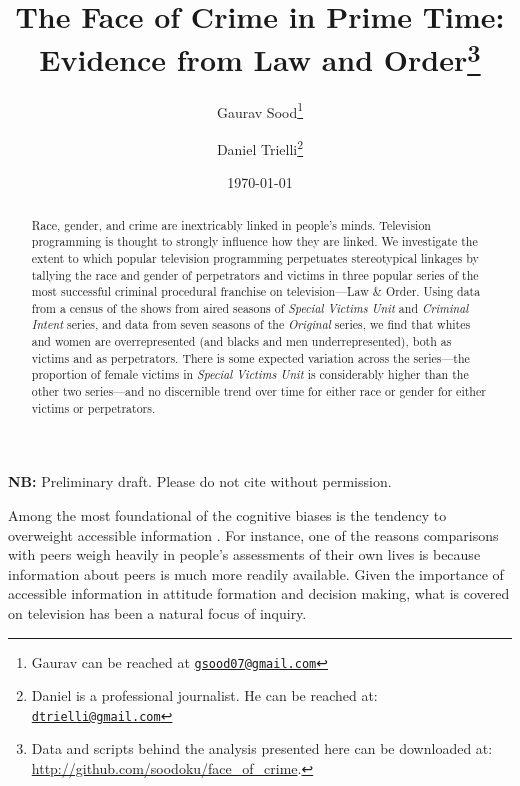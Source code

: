 \documentclass[12pt, letterpaper]{article}
\title{\Large{The Face of Crime in Prime Time:\\ Evidence from Law and Order}\footnote{Data and scripts behind the analysis presented here can be downloaded at: \url{http://github.com/soodoku/face_of_crime}.}}
\author{Gaurav Sood\thanks{Gaurav can be reached at \href{mailto:gsood07@gmail.com}{\footnotesize{\texttt{gsood07@gmail.com}}}} \and Daniel Trielli\thanks{Daniel is a professional journalist. He can be reached at: \href{mailto:dtrielli@gmail.com}{\footnotesize{\texttt{dtrielli@gmail.com}}}}\vspace{.5cm}}
\date{\vspace{.5cm}\normalsize{\today}}
\begin{document}
\maketitle

\begin{center}
\vspace{.5cm}\textbf{NB:} Preliminary draft. Please do not cite without permission.\vspace{1.5cm}
\end{center}

\begin{abstract}
\noindent Race, gender, and crime are inextricably linked in people's minds. Television programming is thought to strongly influence how they are linked. We investigate the extent to which popular television programming perpetuates stereotypical linkages by tallying the race and gender of perpetrators and victims in three popular series of the most successful criminal procedural franchise on television---Law \& Order. Using data from a census of the shows from aired seasons of \textit{Special Victims Unit} and \textit{Criminal Intent} series, and data from seven seasons of the \textit{Original} series, we find that whites and women are overrepresented (and blacks and men underrepresented), both as victims and as perpetrators. There is some expected variation across the series---the proportion of female victims in \textit{Special Victims Unit} is considerably higher than the other two series---and no discernible trend over time for either race or gender for either victims or perpetrators. 
\end{abstract}
\clearpage
\doublespace

Among the most foundational of the cognitive biases is the tendency to overweight accessible information \citep{tversky1973availability, iyengar2010news, iyengar1990accessibility}. For instance, one of the reasons comparisons with peers weigh heavily in people's assessments of their own lives is because information about peers is much more readily available. Given the importance of accessible information in attitude formation and decision making, what is covered on television has been a natural focus of inquiry. 
\end{document}
